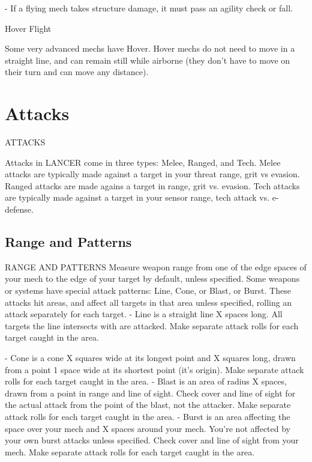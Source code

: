              -    If a flying mech takes structure damage, it must pass an agility check or fall.
 

                                                  Hover Flight  

Some very advanced mechs have Hover. Hover mechs do not need to move in a straight line,  
and can remain still while airborne (they don’t have to move on their turn and can move any  
distance).
                                                                                                                       
\chapter{Attacks}


                                            ATTACKS  

Attacks in LANCER come in three types: Melee, Ranged, and Tech. Melee attacks are typically  
made against a target in your threat range, grit vs evasion. Ranged attacks are made agains a  
target in range, grit vs. evasion. Tech attacks are typically made against a target in your sensor  
range, tech attack vs. e-defense. 
 
\section{Range and Patterns}
                                      RANGE AND PATTERNS  
Measure weapon range from one of the edge spaces of your mech to the edge of your target by  
default, unless specified.   
Some weapons or systems have special attack patterns: Line, Cone, or Blast, or Burst. These  
attacks hit areas, and affect all targets in that area unless specified, rolling an attack separately  
for each target.  
    -    Line is a straight line X spaces long. All targets the line intersects with are attacked. Make  
         separate attack rolls for each target caught in the area.  

                                                                                                                 


     -   Cone is a cone X squares wide at its longest point and X squares long, drawn from a point  
         1 space wide at its shortest point (it’s origin). Make separate attack rolls for each target  
         caught in the area.  
    -    Blast is an area of radius X spaces, drawn from a point in range and line of sight. Check  
         cover and line of sight for the actual attack from the point of the blast, not the attacker.  
         Make separate attack rolls for each target caught in the area.  
    -    Burst is an area affecting the space over your mech and X spaces around your mech.  
         You’re not affected by your own burst attacks unless specified. Check cover and line of  
         sight from your mech. Make separate attack rolls for each target caught in the area.  

